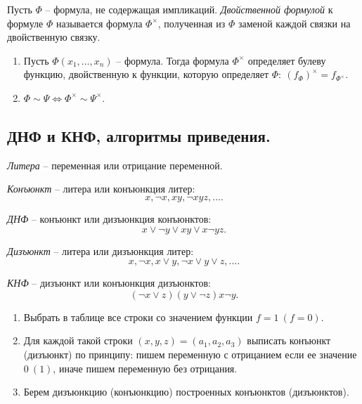\begin{definition}
    Пусть $\Phi$ -- формула, не содержащая импликаций. \emph{Двойственной формулой} к формуле $\Phi$ называется формула $\Phi^\times$, полученная из $\Phi$ заменой каждой связки на двойственную связку.
\end{definition}

\begin{theorem}\leavevmode
    \begin{enumerate}
        \item Пусть $\Phi(x_1,\ldots,x_n)$ -- формула. Тогда формула $\Phi^\times$ определяет булеву функцию, двойственную к функции, которую определяет $\Phi: \ (f_\Phi)^\times = f_{\Phi^\times}$.
        \item $\Phi \sim \Psi \iff \Phi^\times \sim \Psi^\times$.
    \end{enumerate}
\end{theorem}

\subsection{ДНФ и КНФ, алгоритмы приведения.}

\begin{definition}
    \emph{Литера} -- переменная или отрицание переменной.

    \emph{Конъюнкт} -- литера или конъюнкция литер:
    \[
        x,\lnot x, xy, \lnot xyz,\ldots.
    \]

    \emph{ДНФ} -- конъюнкт или дизъюнкция конъюнктов:
    \[
        x \lor \lnot y \lor xy \lor x\lnot yz.
    \]

    \emph{Дизъюнкт} -- литера или дизъюнкция литер:
    \[
        x,\lnot x, x \lor y, \lnot x \lor y \lor z, \ldots.
    \]

    \emph{КНФ} -- дизъюнкт или конъюнкция дизъюнктов:
    \[
        (\lnot x \lor z)(y \lor \lnot z)x\lnot y.
    \]
\end{definition}

\begin{note}\leavevmode
    \begin{enumerate}
        \item Выбрать в таблице все строки со значением функции $f = 1 \ (f = 0)$.
        \item Для каждой такой строки $(x,y,z) = (a_1,a_2,a_3)$ выписать конъюнкт (дизъюнкт) по принципу: пишем переменную с отрицанием если ее значение $0 \ (1)$, иначе пишем переменную без отрицания.
        \item Берем дизъюнкцию (конъюнкцию) построенных конъюнктов (дизъюнктов).
    \end{enumerate}
\end{note}

